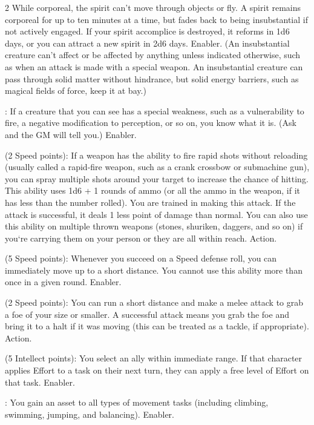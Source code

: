 \begin{multicols}{2}
While corporeal, the spirit can’t move through objects or fly. A spirit remains corporeal for up to ten minutes at a time, but fades back to being insubstantial if not actively engaged. If your spirit accomplice is destroyed, it reforms in 1d6 days, or you can attract a new spirit in 2d6 days. Enabler. (An insubstantial creature can’t affect or be affected by anything unless indicated otherwise, such as when an attack is made with a special weapon. An insubstantial creature can pass through solid matter without hindrance, but solid energy barriers, such as magical fields of force, keep it at bay.)
 
: If a creature that you can see has a special weakness, such as a vulnerability to fire, a negative modification to perception, or so on, you know what it is. (Ask and the GM will tell you.) Enabler. 
 
 (2 Speed points): If a weapon has the ability to fire rapid shots without reloading (usually called a rapid-fire weapon, such as a crank crossbow or submachine gun), you can spray multiple shots around your target to increase the chance of hitting. This ability uses 1d6 + 1 rounds of ammo (or all the ammo in the weapon, if it has less than the number rolled). You are trained in making this attack. If the attack is successful, it deals 1 less point of damage than normal. You can also use this ability on multiple thrown weapons (stones, shuriken, daggers, and so on) if you‘re carrying them on your person or they are all within reach. Action. 
 
 (5 Speed points): Whenever you succeed on a Speed defense roll, you can immediately move up to a short distance. You cannot use this ability more than once in a given round. Enabler. 
 
 (2 Speed points): You can run a short distance and make a melee attack to grab a foe of your size or smaller. A successful attack means you grab the foe and bring it to a halt if it was moving (this can be treated as a tackle, if appropriate). Action. 
 
 (5 Intellect points): You select an ally within immediate range. If that character applies Effort to a task on their next turn, they can apply a free level of Effort on that task. Enabler. 
 
: You gain an asset to all types of movement tasks (including climbing, swimming, jumping, and balancing). Enabler. 
 

\end{multicols}
